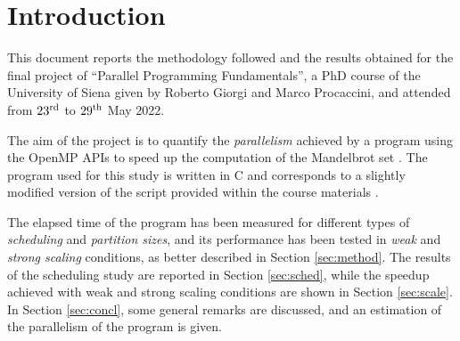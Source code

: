 \section{Introduction}\label{sec:intro}
This document reports the methodology followed and the results obtained for the final project of ``Parallel Programming Fundamentals'', a PhD course of the University of Siena given by Roberto Giorgi and Marco Procaccini, and attended from $23^{\rm{rd}}$ to $29^{\rm{th}}$ May 2022.

The aim of the project is to quantify the \emph{parallelism} achieved by a program using the OpenMP APIs \cite{openmp} to speed up the computation of the Mandelbrot set \cite{mandelbrot}. The program used for this study is written in C and corresponds to a slightly modified version of the  script provided within the course materials \cite{classroom}. 

The elapsed time of the program has been measured for different types of \emph{scheduling} and \emph{partition sizes}, and its performance has been tested in \emph{weak} and \emph{strong scaling} conditions, as better described in Section \ref{sec:method}. The results of the scheduling study are reported in Section \ref{sec:sched}, while the speedup achieved with weak and strong scaling conditions are shown in Section \ref{sec:scale}. In Section \ref{sec:concl}, some general remarks are discussed, and an estimation of the parallelism of the program is given.